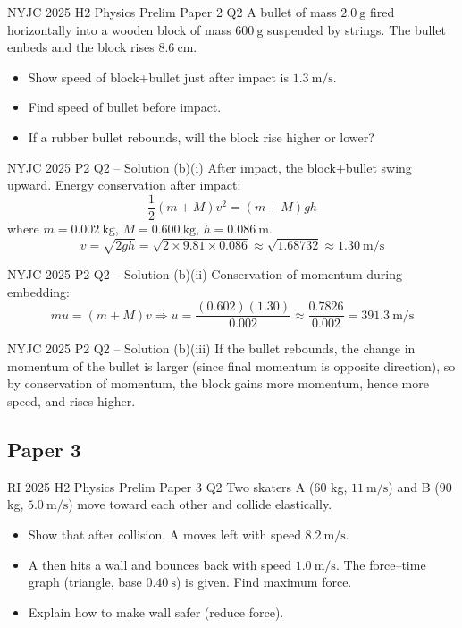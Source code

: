 \documentclass[11pt]{beamer}
\begin{document}
\begin{frame}[shrink=15]{NYJC 2025 H2 Physics Prelim Paper 2 Q2}
A bullet of mass $2.0\ \mathrm{g}$ fired horizontally into a wooden block of mass $600\ \mathrm{g}$ suspended by strings. The bullet embeds and the block rises $8.6\ \mathrm{cm}$.
\begin{itemize}
    \item[(b)(i)] Show speed of block+bullet just after impact is $1.3\ \mathrm{m/s}$.
    \item[(b)(ii)] Find speed of bullet before impact.
    \item[(b)(iii)] If a rubber bullet rebounds, will the block rise higher or lower?
\end{itemize}
\end{frame}

\begin{frame}[shrink=15]{NYJC 2025 P2 Q2 – Solution (b)(i)}
After impact, the block+bullet swing upward. Energy conservation after impact:
\[ \frac12 (m+M) v^2 = (m+M) g h \]
where $m = 0.002\ \mathrm{kg}$, $M = 0.600\ \mathrm{kg}$, $h = 0.086\ \mathrm{m}$.
\[ v = \sqrt{2 g h} = \sqrt{2\times9.81\times0.086} \approx \sqrt{1.68732} \approx 1.30\ \mathrm{m/s} \]
\end{frame}

\begin{frame}{NYJC 2025 P2 Q2 – Solution (b)(ii)}
Conservation of momentum during embedding:
\[ m u = (m+M) v \Rightarrow u = \frac{(0.602)(1.30)}{0.002} \approx \frac{0.7826}{0.002} = 391.3\ \mathrm{m/s} \]
\end{frame}

\begin{frame}{NYJC 2025 P2 Q2 – Solution (b)(iii)}
If the bullet rebounds, the change in momentum of the bullet is larger (since final momentum is opposite direction), so by conservation of momentum, the block gains more momentum, hence more speed, and rises higher.
\end{frame}

\subsection{Paper 3}

\begin{frame}[shrink=15]{RI 2025 H2 Physics Prelim Paper 3 Q2}
Two skaters A (60 kg, $11\ \mathrm{m/s}$) and B (90 kg, $5.0\ \mathrm{m/s}$) move toward each other and collide elastically.
\begin{itemize}
    \item[(b)] Show that after collision, A moves left with speed $8.2\ \mathrm{m/s}$.
    \item[(c)(i)] A then hits a wall and bounces back with speed $1.0\ \mathrm{m/s}$. The force–time graph (triangle, base $0.40\ \mathrm{s}$) is given. Find maximum force.
    \item[(c)(ii)] Explain how to make wall safer (reduce force).
\end{itemize}
\end{frame}
\end{document}
